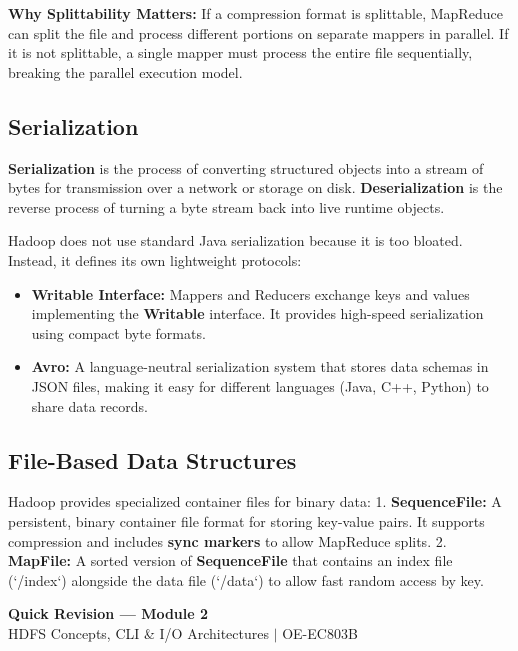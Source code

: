 \documentclass[12pt,a4paper]{article}
\begin{document}
\textbf{Why Splittability Matters:} If a compression format is splittable, MapReduce can split the file and process different portions on separate mappers in parallel. If it is not splittable, a single mapper must process the entire file sequentially, breaking the parallel execution model.

\subsection{Serialization}
\begin{tcolorbox}[defbox, title={Serialization}]
  \textbf{Serialization} is the process of converting structured objects into a stream of bytes for transmission over a network or storage on disk. \textbf{Deserialization} is the reverse process of turning a byte stream back into live runtime objects.
\end{tcolorbox}

Hadoop does not use standard Java serialization because it is too bloated. Instead, it defines its own lightweight protocols:
\begin{itemize}[leftmargin=*, itemsep=3pt]
  \item \textbf{Writable Interface:} Mappers and Reducers exchange keys and values implementing the \textbf{Writable} interface. It provides high-speed serialization using compact byte formats.
  \item \textbf{Avro:} A language-neutral serialization system that stores data schemas in JSON files, making it easy for different languages (Java, C++, Python) to share data records.
\end{itemize}

\subsection{File-Based Data Structures}
Hadoop provides specialized container files for binary data:
1. \textbf{SequenceFile:} A persistent, binary container file format for storing key-value pairs. It supports compression and includes \textbf{sync markers} to allow MapReduce splits.
2. \textbf{MapFile:} A sorted version of \textbf{SequenceFile} that contains an index file (`/index`) alongside the data file (`/data`) to allow fast random access by key.

\newpage

\begin{center}
  {\large\bfseries\color{myred} Quick Revision --- Module 2}\\[3pt]
  {\small\color{mydark} HDFS Concepts, CLI \& I/O Architectures $|$ OE-EC803B}
\end{center}
\noindent{\color{myred}\rule{\linewidth}{1.2pt}}
\vspace{8pt}
\end{document}
